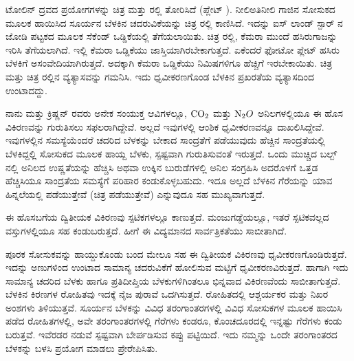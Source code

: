 ಟೋಲಿನ್ ದ್ರವದ ಪ್ರಯೋಗಗಳನ್ನು ಚಿತ್ರ  ಮತ್ತು ರಲ್ಲಿ ತೋರಿಸಿದೆ (ಪ್ಲೇಟ್ ). ನೀಲಿ\enginline{-}ಅತಿನೀಲಿ ಗಾಜಿನ ಸೋಸುಕದ ಮೂಲಕ ಹಾಯಿಸಿದ ಸೂರ್ಯನ ಬೆಳಕಿನ ಚದರುವಿಕೆಯನ್ನು ಚಿತ್ರ ರಲ್ಲಿ ಕಾಣಿಸಿದೆ. ಇದನ್ನು ಐಸ್ ಲಾಂಡ್ ಸ್ಪಾರ್ ನ ಜೋಡಿ ಪಟ್ಟಕದ ಮೂಲಕ  ಸೆಕೆಂಡ್ ಒಡ್ಡಿಕೆಯಲ್ಲಿ ತೆಗೆಯಲಾಯಿತು. ಚಿತ್ರ ರಲ್ಲಿ, ಕೆಮರಾ ಮುಂದೆ ಹಸಿರುಗಾಜನ್ನು ಇರಿಸಿ ತೆಗೆಯಲಾಗಿದೆ. ಇಲ್ಲಿ ಕೆಮರಾ ಒಡ್ಡಿಕೆಯು ಜಾಸ್ತಿಯಾಗಿರಬೇಕಾಗುತ್ತದೆ. ಏಕೆಂದರೆ ಫೋಟೋ ಪ್ಲೇಟ್ ಹಸಿರು ಬೆಳಕಿಗೆ ಅಸಂವೇದಿಯಾಗಿರುತ್ತದೆ. ಅದಕ್ಕಾಗಿ ಕೆಮರಾ ಒಡ್ಡಿಕೆಯು  ನಿಮಿಷಗಳಿಗೂ ಹೆಚ್ಚಿಗೆ ಇರಬೇಕಾಯಿತು. ಚಿತ್ರ  ಮತ್ತು ಚಿತ್ರ ರಲ್ಲಿನ ವ್ಯತ್ಯಾಸವನ್ನು ಗಮನಿಸಿ. ಇದು ಧೃವೀಕರಣಗೊಂಡ ಬೆಳಕಿನ ಪ್ರಖರತೆಯ ವ್ಯತ್ಯಾಸದಿಂದ ಉಂಟಾದದ್ದು.

ನಾನು ಮತ್ತು ಕ್ರಿಷ್ಣನ್ ರವರು ಅನೇಕ ಸಂಯುಕ್ತ ಆವಿಗಳಲ್ಲೂ, ${\rm CO}_2$ ಮತ್ತು ${\rm N}_2O$ ಅನಿಲಗಳಲ್ಲಿಯೂ ಈ ಹೊಸ ವಿಕಿರಣವನ್ನು ಗುರುತಿಸಲು ಸಫಲರಾಗಿದ್ದೇವೆ. ಅಲ್ಲದೆ ಇವುಗಳಲ್ಲಿ ಆಂಶಿಕ ಧೃವೀಕರಣವನ್ನೂ ದಾಖಲಿಸಿದ್ದೇವೆ. ಇವುಗಳಲ್ಲಿನ ಸಮಸ್ಯೆಯೆಂದರೆ ಚದರಿದ ಬೆಳಕನ್ನು ಬೇಕಾದ ಸಾಂದ್ರತೆಗೆ ಪಡೆಯುವುದು ಹೆಚ್ಚಿನ ಸಾಂದ್ರತೆಯಲ್ಲಿ ಬೆಳಕಿದ್ದಲ್ಲಿ ಸೋಸುಕದ ಮೂಲಕ ಹಾಯ್ದ ಬೆಳಕು, ಸ್ಪಷ್ಟವಾಗಿ ಗುರುತಿಸುವಂತೆ ಇರುತ್ತದೆ. ಒಂದು ಮುಚ್ಚಿದ ಬಲ್ಬ್ ನಲ್ಲಿ ಅನಿಲದ ಉಷ್ಣತೆಯನ್ನು ಹೆಚ್ಚಿಸಿ ಅಥವಾ ಉಕ್ಕಿನ ಬುರುಡೆಗಳಲ್ಲಿ ಅನಿಲ ಸಂಗ್ರಹಿಸಿ ಅದರೊಳಗೆ ಒತ್ತಡ ಹೆಚ್ಚಿಸಿಯೂ ಸಾಂದ್ರತೆಯ ಸಮಸ್ಯೆಗೆ ಪರಿಹಾರ ಕಂಡುಕೊಳ್ಳಬಹುದು. ಇದೂ ಅಲ್ಲದೆ ಬೆಳಕಿನ ಗೆರೆಯನ್ನು ಯಾವ ಹಿನ್ನಲೆಯಲ್ಲಿ ಪಡೆಯುತ್ತೇವೆ (ಚಿತ್ರ ಪಡೆಯುತ್ತೇವೆ) ಎನ್ನುವುದೂ ಸಹ ಮುಖ್ಯವಾಗುತ್ತದೆ.

ಈ ಹೊಸಬಗೆಯ ದ್ವಿತೀಯಕ ವಿಕಿರಣವು ಸ್ಪಟಿಕಗಳಲ್ಲೂ ಕಾಣುತ್ತದೆ. ಮಂಜುಗಡ್ಡೆಯಲ್ಲೂ, ಇತರೆ ಸ್ಪಟಿಕವಲ್ಲದ ವಸ್ತುಗಳಲ್ಲಿಯೂ ಸಹ ಕಂಡುಬರುತ್ತದೆ. ಹೀಗೆ ಈ ವಿದ್ಯಮಾನದ ಸಾರ್ವತ್ರಿಕತೆಯು ಸಾಬೀತಾಗಿದೆ.



ಪೂರಕ ಸೋಸುಕವನ್ನು ಹಾಯ್ದುಕೊಂಡು ಬಂದ ಮೇಲೂ ಸಹ ಈ ದ್ವಿತೀಯಕ ವಿಕಿರಣವು ಧೃವೀಕರಣಗೊಂಡಿರುತ್ತದೆ. ಇದನ್ನು ಅಣುಗಳಿಂದ ಉಂಟಾದ ಸಾಮಾನ್ಯ ಚದರುವಿಕೆಗೆ ಹೋಲಿಸುವ ಮಟ್ಟಿಗೆ ಧೃವೀಕರಣವಿರುತ್ತದೆ. ಹಾಗಾಗಿ ಇದು ಸಾಮಾನ್ಯ ಚದರಿದ ಬೆಳಕು ಹಾಗೂ ಪ್ರತಿದೀಪ್ತಿಯ ಬೆಳಕುಗಳಿಗಿಂತಲೂ ಭಿನ್ನವಾದ ವಿಕಿರಣವೆಂದು ಸಾಬೀತಾಗುತ್ತದೆ. ಬೆಳಕಿನ ಕಿರಣಗಳ ರೋಹಿತವು ಇದಕ್ಕೆ ನೈಜ ಪುರಾವೆ ಒದಗಿಸುತ್ತದೆ. ರೋಹಿತದಲ್ಲಿ ಆಶ್ಚರ್ಯಕರ ಮತ್ತು ನಿಖರ ಅಂಶಗಳು ತಿಳಿಯುತ್ತವೆ. ಸೂರ್ಯನ ಬೆಳಕನ್ನು ವಿವಿಧ ತರಂಗಾಂತರಗಳಲ್ಲಿ ವಿವಿಧ ಸೋಸುಕಗಳ ಮೂಲಕ ಹಾಯಿಸಿ ಪಡೆದ ರೋಹಿತಗಳಲ್ಲಿ, ಅವೇ ತರಂಗಾಂತರಗಳಲ್ಲಿ ಗೆರೆಗಳು ಕಂಡರೂ, ಕೊಂಚದೂರದಲ್ಲಿ ಇನ್ನಷ್ಟು ಗೆರೆಗಳು ಕಂಡು ಬರುತ್ತವೆ. ಇವೆರಡರ ನಡುವೆ ಸ್ಪಷ್ಟವಾಗಿ ಬೇರ್ಪಡಿಸುವ ಕಪ್ಪು ಪಟ್ಟಿಯಿದೆ. ಇದು ನಮ್ಮನ್ನು ಒಂದೇ ತರಂಗಾಂತರದ ಬೆಳಕನ್ನು ಬಳಸಿ ಪ್ರಯೋಗ ಮಾಡಲು ಪ್ರೇರೇಪಿಸಿತು.

